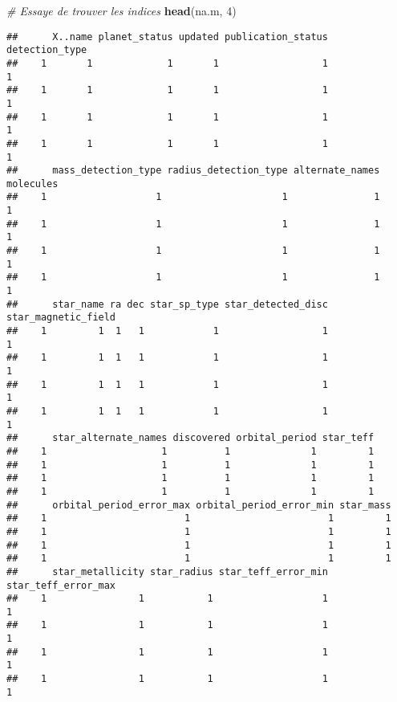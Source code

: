\documentclass[]{article}
\newenvironment{Shaded}{\begin{snugshade}}{\end{snugshade}}
\newcommand{\KeywordTok}[1]{\textcolor[rgb]{0.13,0.29,0.53}{\textbf{{#1}}}}
\newcommand{\DecValTok}[1]{\textcolor[rgb]{0.00,0.00,0.81}{{#1}}}
\newcommand{\CommentTok}[1]{\textcolor[rgb]{0.56,0.35,0.01}{\textit{{#1}}}}
\newcommand{\NormalTok}[1]{{#1}}
\begin{document}
\begin{Shaded}
\begin{Highlighting}[]
\CommentTok{# Essaye de trouver les indices}
\KeywordTok{head}\NormalTok{(na.m, }\DecValTok{4}\NormalTok{)}
\end{Highlighting}
\end{Shaded}

\begin{verbatim}
##      X..name planet_status updated publication_status detection_type
##    1       1             1       1                  1              1
##    1       1             1       1                  1              1
##    1       1             1       1                  1              1
##    1       1             1       1                  1              1
##      mass_detection_type radius_detection_type alternate_names molecules
##    1                   1                     1               1         1
##    1                   1                     1               1         1
##    1                   1                     1               1         1
##    1                   1                     1               1         1
##      star_name ra dec star_sp_type star_detected_disc star_magnetic_field
##    1         1  1   1            1                  1                   1
##    1         1  1   1            1                  1                   1
##    1         1  1   1            1                  1                   1
##    1         1  1   1            1                  1                   1
##      star_alternate_names discovered orbital_period star_teff
##    1                    1          1              1         1
##    1                    1          1              1         1
##    1                    1          1              1         1
##    1                    1          1              1         1
##      orbital_period_error_max orbital_period_error_min star_mass
##    1                        1                        1         1
##    1                        1                        1         1
##    1                        1                        1         1
##    1                        1                        1         1
##      star_metallicity star_radius star_teff_error_min star_teff_error_max
##    1                1           1                   1                   1
##    1                1           1                   1                   1
##    1                1           1                   1                   1
##    1                1           1                   1                   1

\end{verbatim}
\end{document}
